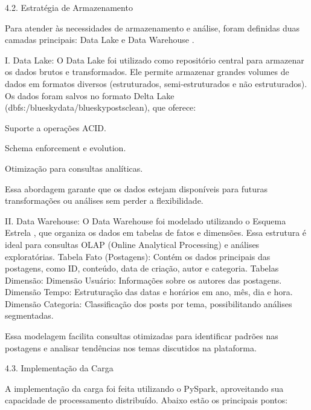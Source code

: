 \documentclass[
  letterpaper,
  DIV=11,
  numbers=noendperiod]{scrartcl}
\begin{document}
4.2. Estratégia de Armazenamento

Para atender às necessidades de armazenamento e análise, foram definidas
duas camadas principais: Data Lake e Data Warehouse .

\begin{VerbatimWithBreaks}
I. Data Lake:  
    O Data Lake  foi utilizado como repositório central para armazenar os dados brutos e transformados. Ele permite armazenar grandes volumes de dados em formatos diversos (estruturados, semi-estruturados e não estruturados).
    Os dados foram salvos no formato Delta Lake (dbfs:/bluesky\textunderscore data/bluesky\textunderscore posts\textunderscore clean), que oferece:
    
        Suporte a operações ACID.
        
        Schema enforcement e evolution.
        
        Otimização para consultas analíticas.
         
    Essa abordagem garante que os dados estejam disponíveis para futuras transformações ou análises sem perder a flexibilidade.
     

II. Data Warehouse:  
    O Data Warehouse  foi modelado utilizando o Esquema Estrela , que organiza os dados em tabelas de fatos e dimensões. Essa estrutura é ideal para consultas OLAP (Online Analytical Processing) e análises exploratórias.
    Tabela Fato (Postagens):  Contém os dados principais das postagens, como ID, conteúdo, data de criação, autor e categoria.
    Tabelas Dimensão: 
        Dimensão Usuário:  Informações sobre os autores das postagens.
        Dimensão Tempo:  Estruturação das datas e horários em ano, mês, dia e hora.
        Dimensão Categoria:  Classificação dos posts por tema, possibilitando análises segmentadas.
         
    Essa modelagem facilita consultas otimizadas para identificar padrões nas postagens e analisar tendências nos temas discutidos na plataforma.
     
 
\end{VerbatimWithBreaks}

4.3. Implementação da Carga

A implementação da carga foi feita utilizando o PySpark, aproveitando
sua capacidade de processamento distribuído. Abaixo estão os principais
pontos:
\end{document}
